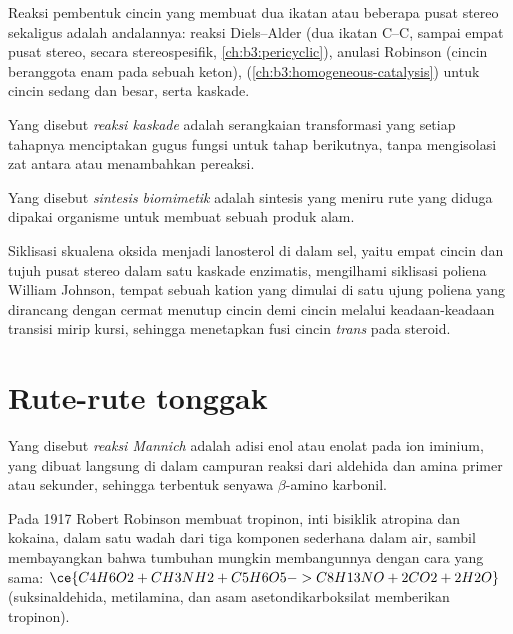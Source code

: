 Reaksi pembentuk cincin yang membuat dua ikatan atau beberapa pusat stereo sekaligus
adalah andalannya: reaksi Diels--Alder (dua ikatan C--C, sampai empat
pusat stereo, secara stereospesifik, \cref{ch:b3:pericyclic}), anulasi
Robinson (cincin beranggota enam pada sebuah keton), 
(\cref{ch:b3:homogeneous-catalysis}) untuk cincin sedang dan besar, serta kaskade.

\begin{definition}\label{def:b3:total-synthesis:cascade}
Yang disebut \emph{reaksi kaskade} adalah serangkaian
transformasi yang setiap tahapnya menciptakan gugus fungsi untuk tahap berikutnya,
tanpa mengisolasi zat antara atau menambahkan pereaksi.
\end{definition}

\begin{definition}\label{def:b3:total-synthesis:biomimetic}
Yang disebut \emph{sintesis biomimetik} adalah sintesis yang meniru rute
yang diduga dipakai organisme untuk membuat sebuah produk alam.
\end{definition}

Siklisasi skualena oksida menjadi lanosterol di dalam sel, yaitu empat cincin dan tujuh
pusat stereo dalam satu kaskade enzimatis, mengilhami siklisasi poliena
William Johnson, tempat sebuah kation yang dimulai di satu ujung poliena yang dirancang dengan cermat
menutup cincin demi cincin melalui keadaan-keadaan transisi mirip kursi, sehingga menetapkan
fusi cincin \textit{trans} pada steroid.

\section{Rute-rute tonggak}

\begin{definition}\label{def:b3:total-synthesis:mannich}
Yang disebut \emph{reaksi Mannich} adalah adisi enol
atau enolat pada ion iminium, yang dibuat langsung di dalam campuran reaksi dari aldehida dan amina primer atau
sekunder, sehingga terbentuk senyawa $\beta$-amino karbonil.
\end{definition}

Pada 1917 Robert Robinson membuat tropinon, inti bisiklik atropina dan
kokaina, dalam satu wadah dari tiga komponen sederhana dalam air, sambil membayangkan bahwa
tumbuhan mungkin membangunnya dengan cara yang sama:
$\ce{C4H6O2 + CH3NH2 + C5H6O5 -> C8H13NO + 2CO2 + 2H2O}$ (suksinaldehida, metilamina, dan
asam asetondikarboksilat memberikan tropinon).

